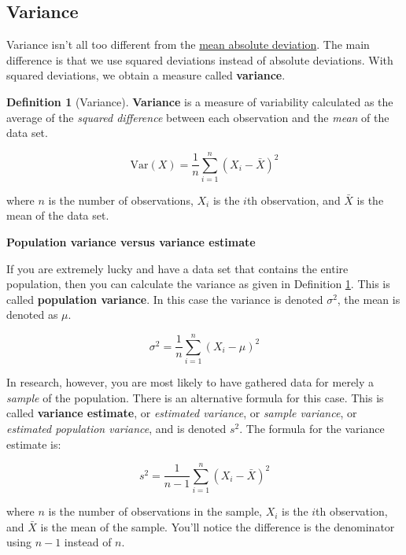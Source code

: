 \documentclass[
]{book}
\newenvironment{callouttitle}{}{}
\theoremstyle{definition}
\newtheorem{definition}{Definition}[chapter]
\theoremstyle{definition}
\theoremstyle{definition}
\theoremstyle{definition}
\theoremstyle{remark}
\begin{document}
\hypertarget{variance}{%
\subsection{Variance}\label{variance}}

Variance isn't all too different from the \protect\hyperlink{aad}{mean absolute deviation}. The main difference is that we use squared deviations instead of absolute deviations. With squared deviations, we obtain a measure called \textbf{variance}.

\begin{definition}[Variance]
\protect\hypertarget{def:defVar}{}\label{def:defVar}\textbf{Variance} is a measure of variability calculated as the average of the \emph{squared difference} between each observation and the \emph{mean} of the data set.

\[
\mbox{Var}(X) = \frac{1}{n} \sum_{i=1}^n (X_i - \bar{X})^2
\]

where \(n\) is the number of observations, \(X_i\) is the \(i\)th observation, and \(\bar{X}\) is the mean of the data set.
\end{definition}

\hypertarget{calloutVar}{}
\begin{callout}

\begin{callouttitle}
\textbf{Population variance versus variance estimate}

\end{callouttitle}

\nopagebreak

If you are extremely lucky and have a data set that contains the entire population, then you can calculate the variance as given in Definition \ref{def:defVar}. This is called \textbf{population variance}. In this case the variance is denoted \(\sigma^2\), the mean is denoted as \(\mu\).

\[
\sigma^2 = \frac{1}{n} \sum_{i=1}^n (X_i - \mu)^2
\]

In research, however, you are most likely to have gathered data for merely a \emph{sample} of the population. There is an alternative formula for this case. This is called \textbf{variance estimate}, or \emph{estimated variance}, or \emph{sample variance}, or \emph{estimated population variance}, and is denoted \(s^2\). The formula for the variance estimate is:

\[
s^2 = \frac{1}{n-1} \sum_{i=1}^n (X_i - \bar{X})^2
\]

where \(n\) is the number of observations in the sample, \(X_i\) is the \(i\)th observation, and \(\bar{X}\) is the mean of the sample. You'll notice the difference is the denominator using \(n-1\) instead of \(n\).

\end{callout}
\end{document}
